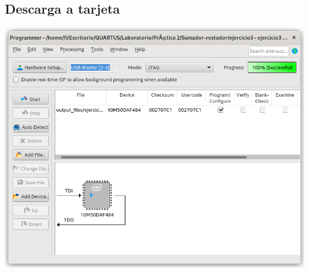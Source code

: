 \documentclass[10pt,a4paper]{article}
\begin{document}
	\subsection{Descarga a tarjeta}
	\begin{center}
		\includegraphics[scale=0.35]{Descarga.png}
	\end{center}
\end{document}
